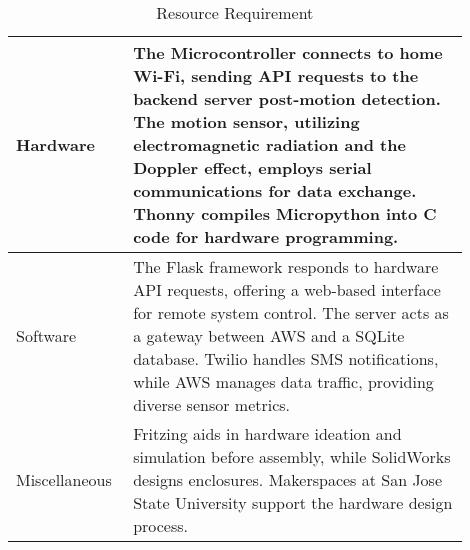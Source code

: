 \begin{table}[htbp]
    \begin{center}
        \begin{tabular}{|p{0.2\linewidth}|p{0.7\linewidth}|}
            \hline
            Hardware      & The Microcontroller connects to home Wi-Fi, sending API requests to the backend server post-motion detection. The motion sensor, utilizing electromagnetic radiation and the Doppler effect, employs serial communications for data exchange. Thonny compiles Micropython into C code for hardware programming.
            \\
            \hline
            Software      & The Flask framework responds to hardware API requests, offering a web-based interface for remote system control. The server acts as a gateway between AWS and a SQLite database. Twilio handles SMS notifications, while AWS manages data traffic, providing diverse sensor metrics.
            \\
            \hline
            Miscellaneous & Fritzing aids in hardware ideation and simulation before assembly, while SolidWorks designs enclosures. Makerspaces at San Jose State University support the hardware design process.                                                                                                                           \\
            \hline
        \end{tabular}
    \end{center}
    \caption{Resource Requirement}
    \label{tab:tab1}
\end{table}
